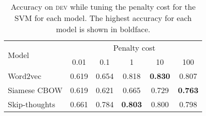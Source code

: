 \documentclass[11pt,a4paper]{article}
\newcommand{\dev}{\textsc{dev}\xspace}
\begin{document}

\begin{table}
\setlength{\tabcolsep}{0.17em}
\begin{center}
\begin{tabular}{l|ccccc}
\multirow{2}{*}{Model} & \multicolumn{5}{c}{Penalty cost}\\
\cline{2-6}
 &0.01 &0.1 &1 &10 &100\\
\hline
Word2vec     &0.619 &0.654 &0.818 &\textbf{0.830} &0.807\\
Siamese CBOW &0.619 &0.621 &0.665 &0.729 & \textbf{0.763}\\
Skip-thoughts &0.661& 0.784 &\textbf{0.803} &0.800 &0.798\\
\end{tabular}
\caption{Accuracy on \dev while tuning the penalty cost for the SVM
  for each model. The highest accuracy for each model is shown in
  boldface. \label{TuningAll}}
\end{center}
\end{table}



\end{document}

